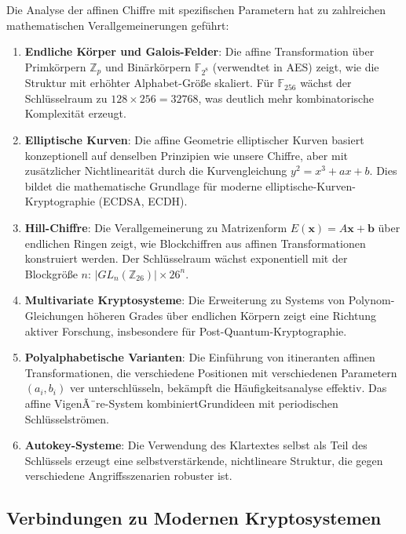 ﻿\documentclass[12pt,a4paper]{article}
\begin{document}
	Die Analyse der affinen Chiffre mit spezifischen Parametern hat zu zahlreichen mathematischen Verallgemeinerungen geführt:
	
	\begin{enumerate}
		\item \textbf{Endliche Körper und Galois-Felder}: Die affine Transformation über Primkörpern $\mathbb{Z}_p$ und Binärkörpern $\mathbb{F}_{2^8}$ (verwendtet in AES) zeigt, wie die Struktur mit erhöhter Alphabet-Größe skaliert. Für $\mathbb{F}_{256}$ wächst der Schlüsselraum zu $128 \times 256 = 32768$, was deutlich mehr kombinatorische Komplexität erzeugt.
		
		\item \textbf{Elliptische Kurven}: Die affine Geometrie elliptischer Kurven basiert konzeptionell auf denselben Prinzipien wie unsere Chiffre, aber mit zusätzlicher Nichtlinearität durch die Kurvengleichung $y^2 = x^3 + ax + b$. Dies bildet die mathematische Grundlage für moderne elliptische-Kurven-Kryptographie (ECDSA, ECDH).
		
		\item \textbf{Hill-Chiffre}: Die Verallgemeinerung zu Matrizenform $E(\mathbf{x}) = A\mathbf{x} + \mathbf{b}$ über endlichen Ringen zeigt, wie Blockchiffren aus affinen Transformationen konstruiert werden. Der Schlüsselraum wächst exponentiell mit der Blockgröße $n$: $|GL_n(\mathbb{Z}_{26})| \times 26^n$.
		
		\item \textbf{Multivariate Kryptosysteme}: Die Erweiterung zu Systems von Polynom-Gleichun\-gen höheren Grades über endlichen Körpern zeigt eine Richtung aktiver Forschung, insbesondere für Post-Quantum-Kryptographie.
		
		\item \textbf{Polyalphabetische Varianten}: Die Einführung von itineranten affinen Transformationen, die verschiedene Positionen mit verschiedenen Parametern $(a_i, b_i)$ ver unterschlüsseln, bekämpft die Häufigkeitsanalyse effektiv. Das affine VigenÃ¨re-System kombiniertGrundideen mit periodischen Schlüsselströmen.
		
		\item \textbf{Autokey-Systeme}: Die Verwendung des Klartextes selbst als Teil des Schlüssels erzeugt eine selbstverstärkende, nichtlineare Struktur, die gegen verschiedene Angriffsszenarien robuster ist.
	\end{enumerate}
	
	\subsection{Verbindungen zu Modernen Kryptosystemen}
	
\end{document}
